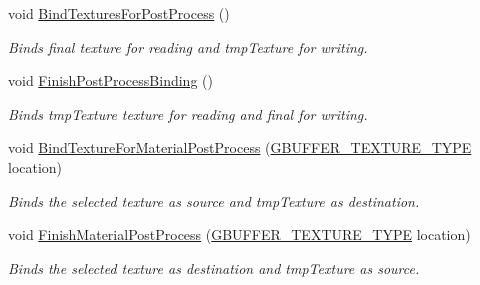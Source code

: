 \begin{DoxyCompactItemize}
void \mbox{\hyperlink{class_geometry_engine_1_1_geometry_buffer_1_1_g_buffer_a9c67280eb1c468c049674662bc81af5b}{Bind\+Textures\+For\+Post\+Process}} ()
\begin{DoxyCompactList}\small\item\em Binds final texture for reading and tmp\+Texture for writing. \end{DoxyCompactList}\item 
\mbox{\label{class_geometry_engine_1_1_geometry_buffer_1_1_g_buffer_aeb43b5511b3644649054af798775bd12}} 
void \mbox{\hyperlink{class_geometry_engine_1_1_geometry_buffer_1_1_g_buffer_aeb43b5511b3644649054af798775bd12}{Finish\+Post\+Process\+Binding}} ()
\begin{DoxyCompactList}\small\item\em Binds tmp\+Texture texture for reading and final for writing. \end{DoxyCompactList}\item 
\mbox{\label{class_geometry_engine_1_1_geometry_buffer_1_1_g_buffer_a0ec01928c1b5a54144e94ce4048f6d6f}} 
void \mbox{\hyperlink{class_geometry_engine_1_1_geometry_buffer_1_1_g_buffer_a0ec01928c1b5a54144e94ce4048f6d6f}{Bind\+Texture\+For\+Material\+Post\+Process}} (\mbox{\hyperlink{class_geometry_engine_1_1_geometry_buffer_1_1_g_buffer_a718dceafcac1915f7de061108597e1cc}{G\+B\+U\+F\+F\+E\+R\+\_\+\+T\+E\+X\+T\+U\+R\+E\+\_\+\+T\+Y\+PE}} location)
\begin{DoxyCompactList}\small\item\em Binds the selected texture as source and tmp\+Texture as destination. \end{DoxyCompactList}\item 
\mbox{\label{class_geometry_engine_1_1_geometry_buffer_1_1_g_buffer_a5ddb3104812ac586c874a723ba0f3dc1}} 
void \mbox{\hyperlink{class_geometry_engine_1_1_geometry_buffer_1_1_g_buffer_a5ddb3104812ac586c874a723ba0f3dc1}{Finish\+Material\+Post\+Process}} (\mbox{\hyperlink{class_geometry_engine_1_1_geometry_buffer_1_1_g_buffer_a718dceafcac1915f7de061108597e1cc}{G\+B\+U\+F\+F\+E\+R\+\_\+\+T\+E\+X\+T\+U\+R\+E\+\_\+\+T\+Y\+PE}} location)
\begin{DoxyCompactList}\small\item\em Binds the selected texture as destination and tmp\+Texture as source. \end{DoxyCompactList}\item 

\end{DoxyCompactItemize}
